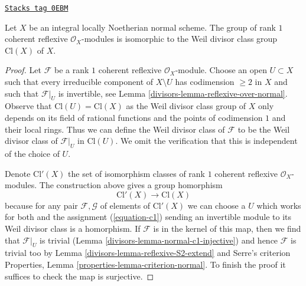 \begin{lemma}
\label{divisors-lemma-normal-class-group}
\href{https://stacks.math.columbia.edu/tag/0EBM}{\texttt{Stacks tag 0EBM}}

Let $X$ be an integral locally Noetherian normal scheme.
The group of rank $1$ coherent reflexive $\mathcal{O}_X$-modules
is isomorphic to the Weil divisor class group $\text{Cl}(X)$ of $X$.
\end{lemma}

\begin{proof}

Let $\mathcal{F}$ be a rank $1$ coherent reflexive $\mathcal{O}_X$-module.
Choose an open $U \subset X$ such that
every irreducible component of $X \setminus U$ has codimension $\geq 2$
in $X$ and such that $\mathcal{F}|_U$ is invertible, see
Lemma \ref{divisors-lemma-reflexive-over-normal}.
Observe that $\text{Cl}(U) = \text{Cl}(X)$
as the Weil divisor class group of $X$ only depends on
its field of rational functions and the points of
codimension $1$ and their local rings.
Thus we can define the Weil divisor class of $\mathcal{F}$
to be the Weil divisor class of $\mathcal{F}|_U$
in $\text{Cl}(U)$. We omit the verification that this
is independent of the choice of $U$.

\medskip\noindent
Denote $\text{Cl}'(X)$ the set of isomorphism classes of
rank $1$ coherent reflexive $\mathcal{O}_X$-modules. The
construction above gives a group homorphism
$$
\text{Cl}'(X) \longrightarrow \text{Cl}(X)
$$
because for any pair $\mathcal{F}, \mathcal{G}$ of elements
of $\text{Cl}'(X)$ we can choose a $U$ which works for both
and the assignment (\ref{equation-c1}) sending an invertible
module to its Weil divisor class is a homorphism.
If $\mathcal{F}$ is in the kernel of this map, then we find that
$\mathcal{F}|_U$ is trivial (Lemma \ref{divisors-lemma-normal-c1-injective})
and hence $\mathcal{F}$ is trivial too by
Lemma \ref{divisors-lemma-reflexive-S2-extend} and Serre's criterion
Properties, Lemma \ref{properties-lemma-criterion-normal}.
To finish the proof it suffices to check the map is surjective.


\end{proof}
